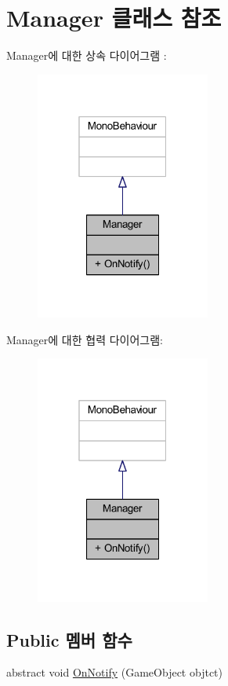 \hypertarget{class_manager}{}\section{Manager 클래스 참조}
\label{class_manager}


Manager에 대한 상속 다이어그램 \+: 
\nopagebreak
\begin{figure}[H]
\begin{center}
\leavevmode
\includegraphics[width=163pt]{d6/df2/class_manager__inherit__graph}
\end{center}
\end{figure}


Manager에 대한 협력 다이어그램\+:
\nopagebreak
\begin{figure}[H]
\begin{center}
\leavevmode
\includegraphics[width=163pt]{d1/db0/class_manager__coll__graph}
\end{center}
\end{figure}
\subsection*{Public 멤버 함수}
\begin{DoxyCompactItemize}
\item 
abstract void \mbox{\hyperlink{class_manager_af8f781331eb3451725d6b0a78131de19}{On\+Notify}} (Game\+Object objtct)
\end{DoxyCompactItemize}


